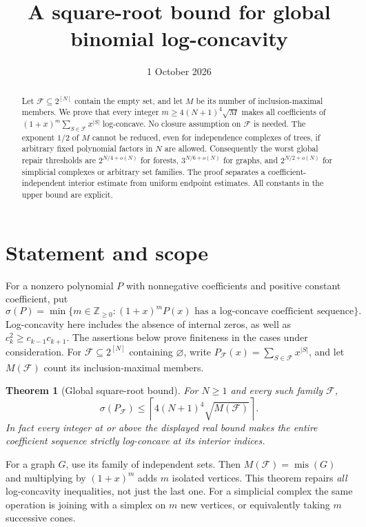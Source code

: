 \documentclass[11pt]{article}
\title{A square-root bound for global binomial log-concavity}
\author{}
\date{1 October 2026}
\newtheorem{theorem}{Theorem}
\newcommand{\mis}{\operatorname{mis}}
\begin{document}
\maketitle
\begin{abstract}
Let $\mathcal F\subseteq2^{[N]}$ contain the empty set, and let $M$ be
its number of inclusion-maximal members. We prove that every integer
$m\ge4(N+1)^4\sqrt M$ makes all coefficients of
$(1+x)^m\sum_{S\in\mathcal F}x^{|S|}$ log-concave.
No closure assumption on $\mathcal F$ is needed. The exponent $1/2$ of
$M$ cannot be reduced, even for independence complexes of trees, if
arbitrary fixed polynomial factors in $N$ are allowed.
Consequently the worst global repair thresholds are
$2^{N/4+o(N)}$ for forests, $3^{N/6+o(N)}$ for graphs, and
$2^{N/2+o(N)}$ for simplicial complexes or arbitrary set families.
The proof separates a coefficient-independent interior estimate from
uniform endpoint estimates. All constants in the upper bound are explicit.
\end{abstract}

\section{Statement and scope}
For a nonzero polynomial $P$ with nonnegative coefficients and positive
constant coefficient, put
\[
 \sigma(P)=\min\{m\in\mathbb Z_{\ge0}:
        (1+x)^mP(x)\text{ has a log-concave coefficient sequence}\}.
\]
Log-concavity here includes the absence of internal zeros, as well as
$c_k^2\ge c_{k-1}c_{k+1}$.
The assertions below prove finiteness in the cases under consideration.
For $\mathcal F\subseteq2^{[N]}$ containing $\varnothing$, write
$P_{\mathcal F}(x)=\sum_{S\in\mathcal F}x^{|S|}$, and let
$M(\mathcal F)$ count its inclusion-maximal members.

\begin{theorem}[Global square-root bound]\label{thm:main}
For $N\ge1$ and every such family $\mathcal F$,
\[
 \boxed{\quad\sigma(P_{\mathcal F})\le
       \left\lceil4(N+1)^4\sqrt{M(\mathcal F)}\right\rceil.\quad}
\]
In fact every integer at or above the displayed real bound makes the
entire coefficient sequence strictly log-concave at its interior indices.
\end{theorem}

For a graph $G$, use its family of independent sets. Then $M(\mathcal F)
=\mis(G)$ and multiplying by $(1+x)^m$ adds $m$ isolated vertices.
This theorem repairs \emph{all} log-concavity inequalities, not just the
last one. For a simplicial complex the same operation is joining with a
simplex on $m$ new vertices, or equivalently taking $m$ successive cones.
\end{document}
